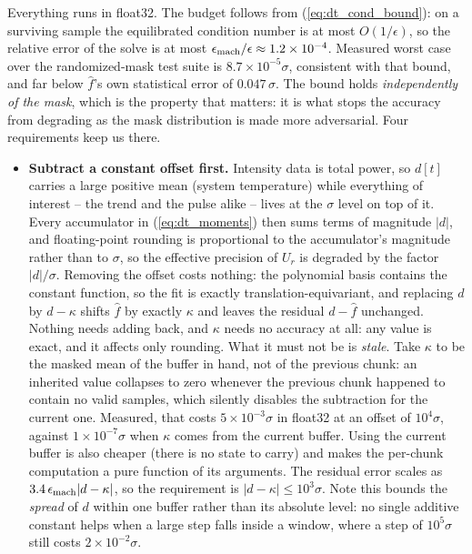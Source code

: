 \documentclass{article}
\numberwithin{equation}{section}   %
\begin{document}
Everything runs in float32.  The budget follows from (\ref{eq:dt_cond_bound}): on a surviving sample the
equilibrated condition number is at most $O(1/\epsilon)$, so the relative error of the solve is at most
$\epsilon_{\rm mach}/\epsilon \approx 1.2\times10^{-4}$.  Measured worst case over the randomized-mask test
suite is $8.7\times10^{-5}\sigma$, consistent with that bound, and far below $\hat f$'s own statistical error of
$0.047\,\sigma$.  The bound holds {\em independently of the mask}, which is the property that matters: it is
what stops the accuracy from degrading as the mask distribution is made more adversarial.  Four requirements
keep us there.

\begin{itemize}
\item {\bf Subtract a constant offset first.}  Intensity data is total power, so $d[t]$ carries a large
positive mean (system temperature) while everything of interest -- the trend and the pulse alike -- lives at
the $\sigma$ level on top of it.  Every accumulator in (\ref{eq:dt_moments}) then sums terms of magnitude
$|d|$, and floating-point rounding is proportional to the accumulator's magnitude rather than to $\sigma$, so
the effective precision of $U_r$ is degraded by the factor $|d|/\sigma$.  Removing the offset costs nothing:
the polynomial basis contains the constant function, so the fit is exactly translation-equivariant, and
replacing $d$ by $d - \kappa$ shifts $\hat f$ by exactly $\kappa$ and leaves the residual $d - \hat f$
unchanged.  Nothing needs adding back, and $\kappa$ needs no accuracy at all: any value is exact, and it
affects only rounding.  What it must not be is {\em stale}.  Take $\kappa$ to be the masked mean of the buffer
in hand, not of the previous chunk: an inherited value collapses to zero whenever the previous chunk happened to
contain no valid samples, which silently disables the subtraction for the current one.  Measured, that costs
$5\times10^{-3}\sigma$ in float32 at an offset of $10^4\sigma$, against $1\times10^{-7}\sigma$ when $\kappa$
comes from the current buffer.  Using the current buffer is also cheaper (there is no state to carry) and makes
the per-chunk computation a pure function of its arguments.
The residual error scales as $3.4\,\epsilon_{\rm mach}|d-\kappa|$, so the requirement is
$|d-\kappa| \le 10^3\sigma$.  Note this bounds the {\em spread} of $d$ within one buffer rather than its
absolute level: no single additive constant helps when a large step falls inside a window, where a step of
$10^5\sigma$ still costs $2\times10^{-2}\sigma$.

\end{itemize}
\end{document}
